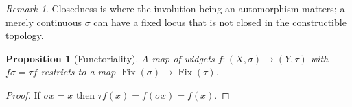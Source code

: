 \documentclass{amsart}
\theoremstyle{plain}
\newtheorem{proposition}[theorem]{Proposition}
\theoremstyle{definition}
\theoremstyle{remark}
\newtheorem{remark}[theorem]{Remark}
\newcommand{\Fix}{\operatorname{Fix}}
\begin{document}
\begin{remark}\label{dm-0004}
Closedness is where the involution being an automorphism matters; a merely continuous $\sigma$ can have a fixed locus that is not closed in the constructible topology.
\end{remark}

\begin{proposition}[Functoriality]\label{dm-0005}
A map of widgets $f\colon (X,\sigma)\to(Y,\tau)$ with $f\sigma = \tau f$ restricts to a map $\Fix(\sigma)\to\Fix(\tau)$.
\end{proposition}
\begin{proof}
If $\sigma x = x$ then $\tau f(x) = f(\sigma x) = f(x)$. 
\end{proof}



\end{document}
